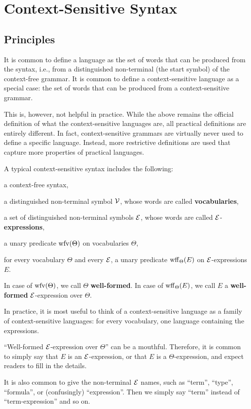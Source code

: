 \section{Context-Sensitive Syntax}

\subsection{Principles}

It is common to define a language as the set of words that can be produced from the syntax, i.e., from a distinguished non-terminal (the start symbol) of the context-free grammar.
It is common to define a context-sensitive language as a special case: the set of words that can be produced from a context-sensitive grammar.

This is, however, not helpful in practice.
While the above remains the official definition of what the context-sensitive languages are, all practical definitions are entirely different.
In fact, context-sensitive grammars are virtually never used to define a specific language.
Instead, more restrictive definitions are used that capture more properties of practical languages.

A typical context-sensitive syntax includes the following:
\begin{compactitem}
 \item a context-free syntax,
 \item a distinguished non-terminal symbol $\mathcal{V}$, whose words are called \textbf{vocabularies},
 \item a set of distinguished non-terminal symbols $\mathcal{E}$, whose words are called $\mathcal{E}$-\textbf{expressions},
 \item a unary predicate $\mathrm{wfv}(\Theta)$ on vocabularies $\Theta$,
 \item for every vocabulary $\Theta$ and every $\mathcal{E}$, a unary predicate $\mathrm{wff}_{\Theta}(E)$ on $\mathcal{E}$-expressions $E$.
\end{compactitem}
In case of $\mathrm{wfv}(\Theta)$, we call $\Theta$ \textbf{well-formed}.
In case of $\mathrm{wff}_{\Theta}(E)$, we call $E$ a \textbf{well-formed} $\mathcal{E}$-expression over $\Theta$.

In practice, it is most useful to think of a context-sensitive language as a family of context-sensitive languages: for every vocabulary, one language containing the expressions.

\begin{remark}[Terminology]
``Well-formed $\mathcal{E}$-expression over $\Theta$'' can be a mouthful.
Therefore, it is common to simply say that $E$ is an $\mathcal{E}$-expression, or that $E$ is a $\Theta$-expression, and expect readers to fill in the details.

It is also common to give the non-terminal $\mathcal{E}$ names, such as ``term'', ``type'', ``formula'', or (confusingly) ``expression''.
Then we simply say ``term'' instead of ``term-expression'' and so on.
\end{remark}

